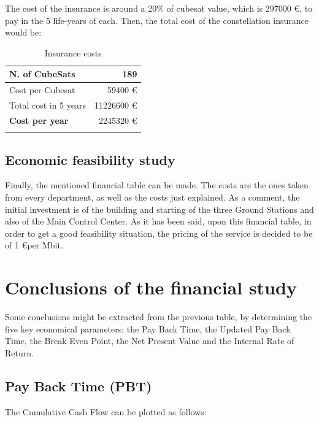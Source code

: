The cost of the insurance is around a 20\% of cubesat value, which is 297000 \euro, to pay in the 5 life-years of each. Then, the total cost of the constellation insurance would be:

\begin{longtable}{| l | r |}
  \hline
	N. of CubeSats & 189 \\
  \hline
    Cost per Cubesat & 59400 \euro  \\
  \hline
    Total cost in 5 years & 11226600 \euro \\
  \hline
  	\textbf{Cost per year} & 2245320 \euro \\
  \hline
\caption[Insurance costs]{Insurance costs}
\end{longtable}

\subsection{Economic feasibility study}

Finally, the mentioned financial table can be made. The costs are the ones taken from every department, as well as the costs just explained. As a comment, the initial investment is of the building and starting of the three Ground Stations and also of the Main Control Center. As it has been said, upon this financial table, in order to get a good feasibility situation, the pricing of the service is decided to be of 1 \euro  per Mbit. 




\section{Conclusions of the financial study}
Some conclusions might be extracted from the previous table, by determining the five key economical parameters: the Pay Back Time, the Updated Pay Back Time, the Break Even Point, the Net Present Value and the Internal Rate of Return. 

\subsection{Pay Back Time (PBT)}
The Cumulative Cash Flow can be plotted as follows:

